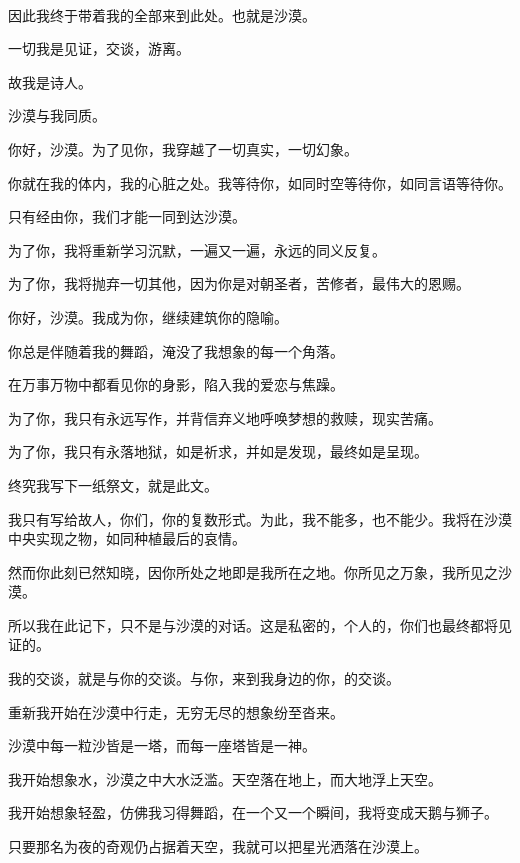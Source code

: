 \documentclass[UTF8]{article}
\begin{document}
\\[0.6cm]
\par 因此我终于带着我的全部来到此处。也就是沙漠。
\par 一切我是见证，交谈，游离。
\par 故我是诗人。
\par 沙漠与我同质。
\\[0.6cm]
\par 你好，沙漠。为了见你，我穿越了一切真实，一切幻象。
\par 你就在我的体内，我的心脏之处。我等待你，如同时空等待你，如同言语等待你。
\par 只有经由你，我们才能一同到达沙漠。
\par 为了你，我将重新学习沉默，一遍又一遍，永远的同义反复。
\par 为了你，我将抛弃一切其他，因为你是对朝圣者，苦修者，最伟大的恩赐。
\\[0.6cm]
\par 你好，沙漠。我成为你，继续建筑你的隐喻。
\par 你总是伴随着我的舞蹈，淹没了我想象的每一个角落。
\par 在万事万物中都看见你的身影，陷入我的爱恋与焦躁。
\par 为了你，我只有永远写作，并背信弃义地呼唤梦想的救赎，现实苦痛。
\par 为了你，我只有永落地狱，如是祈求，并如是发现，最终如是呈现。
\\[0.6cm]
\par 终究我写下一纸祭文，就是此文。
\par 我只有写给故人，你们，你的复数形式。为此，我不能多，也不能少。我将在沙漠中央实现之物，如同种植最后的哀情。
\par 然而你此刻已然知晓，因你所处之地即是我所在之地。你所见之万象，我所见之沙漠。
\par 所以我在此记下，只不是与沙漠的对话。这是私密的，个人的，你们也最终都将见证的。
\par 我的交谈，就是与你的交谈。与你，来到我身边的你，的交谈。
\\[0.6cm]
\par 重新我开始在沙漠中行走，无穷无尽的想象纷至沓来。
\par 沙漠中每一粒沙皆是一塔，而每一座塔皆是一神。
\par 我开始想象水，沙漠之中大水泛滥。天空落在地上，而大地浮上天空。
\par 我开始想象轻盈，仿佛我习得舞蹈，在一个又一个瞬间，我将变成天鹅与狮子。
\par 只要那名为夜的奇观仍占据着天空，我就可以把星光洒落在沙漠上。
\end{document}
